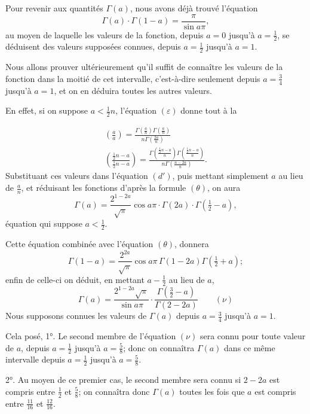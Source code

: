 \documentclass{article}
\begin{document}
Pour revenir aux quantités $\Gamma(a)$, nous avons déjà trouvé l'équation
\[ \Gamma(a)\cdot\Gamma(1-a)=\frac{\pi}{\sin a\pi}, \]
au moyen de laquelle les valeurs de la fonction, depuis $a=0$ jusqu'à $a=\frac{1}{2}$, se déduisent des valeurs supposées connues, depuis $a=\frac{1}{2}$ jusqu'à $a=1$.

Nous allons prouver ultérieurement qu'il suffit de connaître les valeurs de la fonction dans la moitié de cet intervalle, c'est-à-dire seulement depuis $a=\frac{3}{4}$ jusqu'à $a=1$, et on en déduira toutes les autres valeurs.

En effet, si on suppose $a<\frac{1}{2}n$, l'équation $(\varepsilon)$ donne tout à la

\[ \begin{gathered} \left(\frac{a}{a}\right)=\frac{\Gamma\left(\frac{a}{n}\right)\Gamma\left(\frac{a}{n}\right)}{n\Gamma\left(\frac{2a}{n}\right)}\\ \left(\frac{\tfrac{1}{2}n-a}{\tfrac{1}{2}n-a}\right)=\frac{\Gamma\left(\frac{\tfrac{1}{2}n-a}{n}\right)\Gamma\left(\frac{\tfrac{1}{2}n-a}{n}\right)}{n\Gamma\left(\frac{n-2a}{n}\right)}. \end{gathered} \]
Substituant ces valeurs dans l'équation $(d')$, puis mettant simplement $a$ au lieu de $\frac{a}{n}$, et réduisant les fonctions d'après la formule $(\theta)$, on aura
\[ \Gamma(a)=\frac{2^{1-2a}}{\sqrt{\pi}}\cos a\pi\cdot\Gamma(2a)\cdot\Gamma\left(\tfrac{1}{2}-a\right), \]
équation qui suppose $a<\frac{1}{2}$.

Cette équation combinée avec l'équation $(\theta)$, donnera
\[ \Gamma(1-a)=\frac{2^{2a}}{\sqrt{\pi}}\cos a\pi\,\Gamma(1-2a)\Gamma\left(\tfrac{1}{2}+a\right); \]
enfin de celle-ci on déduit, en mettant $a-\frac{1}{2}$ au lieu de $a$,
\[ \Gamma(a)=\frac{2^{1-2a}\sqrt{\pi}}{\sin a\pi}\cdot\frac{\Gamma\left(\tfrac{3}{2}-a\right)}{\Gamma(2-2a)}\qquad(\nu) \]
Nous supposons connues les valeurs de $\Gamma(a)$ depuis $a=\frac{3}{4}$ jusqu'à $a=1$.

Cela posé, 1°. Le second membre de l'équation $(\nu)$ sera connu pour toute valeur de $a$, depuis $a=\frac{1}{2}$ jusqu'à $a=\frac{5}{8}$; donc on connaîtra $\Gamma(a)$ dans ce même intervalle depuis $a=\frac{1}{2}$ jusqu'à $a=\frac{5}{8}$.

2°. Au moyen de ce premier cas, le second membre sera connu si $2-2a$ est compris entre $\frac{1}{2}$ et $\frac{5}{8}$; on connaîtra donc $\Gamma(a)$ toutes les fois que $a$ est compris entre $\frac{11}{16}$ et $\frac{12}{16}$.
\end{document}
